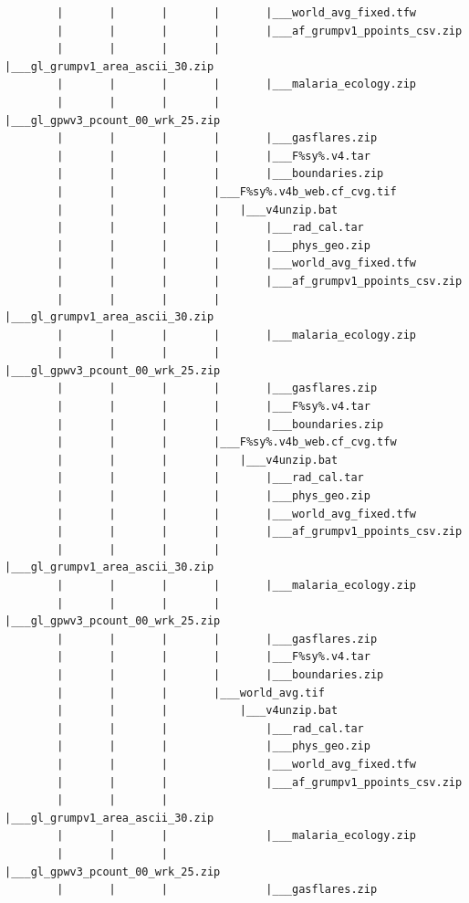 \documentclass[]{book}
\begin{document}
\begin{verbatim}
        |       |       |       |       |___world_avg_fixed.tfw
        |       |       |       |       |___af_grumpv1_ppoints_csv.zip
        |       |       |       |       |___gl_grumpv1_area_ascii_30.zip
        |       |       |       |       |___malaria_ecology.zip
        |       |       |       |       |___gl_gpwv3_pcount_00_wrk_25.zip
        |       |       |       |       |___gasflares.zip
        |       |       |       |       |___F%sy%.v4.tar
        |       |       |       |       |___boundaries.zip
        |       |       |       |___F%sy%.v4b_web.cf_cvg.tif
        |       |       |       |   |___v4unzip.bat
        |       |       |       |       |___rad_cal.tar
        |       |       |       |       |___phys_geo.zip
        |       |       |       |       |___world_avg_fixed.tfw
        |       |       |       |       |___af_grumpv1_ppoints_csv.zip
        |       |       |       |       |___gl_grumpv1_area_ascii_30.zip
        |       |       |       |       |___malaria_ecology.zip
        |       |       |       |       |___gl_gpwv3_pcount_00_wrk_25.zip
        |       |       |       |       |___gasflares.zip
        |       |       |       |       |___F%sy%.v4.tar
        |       |       |       |       |___boundaries.zip
        |       |       |       |___F%sy%.v4b_web.cf_cvg.tfw
        |       |       |       |   |___v4unzip.bat
        |       |       |       |       |___rad_cal.tar
        |       |       |       |       |___phys_geo.zip
        |       |       |       |       |___world_avg_fixed.tfw
        |       |       |       |       |___af_grumpv1_ppoints_csv.zip
        |       |       |       |       |___gl_grumpv1_area_ascii_30.zip
        |       |       |       |       |___malaria_ecology.zip
        |       |       |       |       |___gl_gpwv3_pcount_00_wrk_25.zip
        |       |       |       |       |___gasflares.zip
        |       |       |       |       |___F%sy%.v4.tar
        |       |       |       |       |___boundaries.zip
        |       |       |       |___world_avg.tif
        |       |       |           |___v4unzip.bat
        |       |       |               |___rad_cal.tar
        |       |       |               |___phys_geo.zip
        |       |       |               |___world_avg_fixed.tfw
        |       |       |               |___af_grumpv1_ppoints_csv.zip
        |       |       |               |___gl_grumpv1_area_ascii_30.zip
        |       |       |               |___malaria_ecology.zip
        |       |       |               |___gl_gpwv3_pcount_00_wrk_25.zip
        |       |       |               |___gasflares.zip

\end{verbatim}
\end{document}
